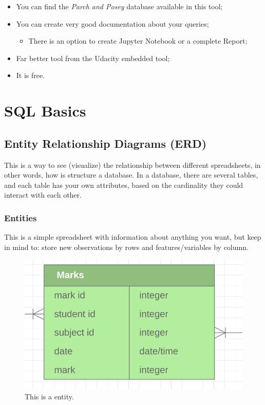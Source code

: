 \documentclass[]{book}
\providecommand{\tightlist}{%
  \setlength{\itemsep}{0pt}\setlength{\parskip}{0pt}}
\begin{document}
\begin{itemize}
\tightlist
\item
  You can find the \emph{Parch and Posey} database available in this
  tool;
\item
  You can create very good documentation about your queries;

  \begin{itemize}
  \tightlist
  \item
    There is an option to create Jupyter Notebook or a complete Report;
  \end{itemize}
\item
  Far better tool from the Udacity embedded tool;
\item
  It is free.
\end{itemize}

\section{SQL Basics}\label{sql-basics}

\subsection{Entity Relationship Diagrams
(ERD)}\label{entity-relationship-diagrams-erd}

This is a way to see (visualize) the relationship between different
spreadsheets, in other words, how is structure a database. In a
database, there are several tables, and each table has your own
attributes, based on the cardinality they could interact with each
other.

\subsubsection{Entities}\label{entities}

This is a simple spreadsheet with information about anything you want,
but keep in mind to: store new observations by rows and
features/variables by column.

\begin{figure}
\centering
\includegraphics{01-img/1.png}
\caption{This is a entity.}
\end{figure}
\end{document}
